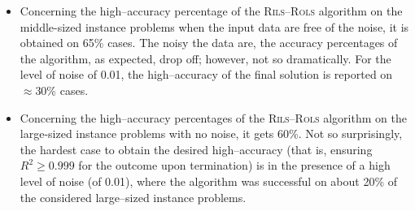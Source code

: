 \documentclass[a4paper,12pt]{elsarticle}
\begin{document}
\begin{itemize}
	\item Concerning the high--accuracy percentage of the \textsc{Rils}--\textsc{Rols} algorithm on the middle-sized instance problems when the input data are free of the noise, it is obtained on 65\% cases.    The noisy the data are, the accuracy percentages of the algorithm, as expected, drop off; however, not so dramatically. For the level of noise of 0.01, the high--accuracy of the final solution is reported on $\approx$30\% cases.
	
	\item Concerning the high--accuracy percentages of the \textsc{Rils}--\textsc{Rols} algorithm on the large-sized instance problems with no noise, it gets 60\%. Not so surprisingly, the hardest case to obtain the desired high--accuracy (that is, ensuring $R^2\geq 0.999$ for the outcome  upon termination) is in the presence of a high level of noise (of 0.01), where the algorithm was successful on about 20\% of the considered large--sized instance problems. 
	
\end{itemize}

\begin{center}
	\label{fig:compExact_noise_size}
\end{center}
\end{document}
